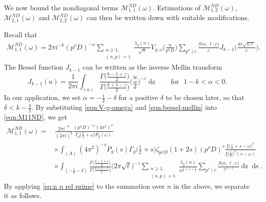 \documentclass[12pt]{amsart}
\theoremstyle{plain}
\theoremstyle{definition}
\begin{document}
We now bound the nondiagonal terms $ \mathcal{M}_{1,1}^{ND}(\omega)$. Estimations of $ \mathcal{M}_{1,2}^{ND}(\omega)$, $ \mathcal{M}_{2,1}^{ND}(\omega)$ and $ \mathcal{M}_{2,2}^{ND}(\omega)$ can then be written down with suitable modifications.
   
 Recall that 
  \begin{align}\label{eqn:M11ND}
     \mathcal{M}_{1,1}^{ND}(\omega)
    = 2\pi i^{-k} (p^\nu D)^{-\omega}  
     \sum_{\substack{n\geq 1, \\ (n, p)=1}}
    \frac{\lambda_g(n)}{\sqrt n} 
    V_{g, \omega}\Big(\frac{n}{p^\nu D}\Big)
    \sum_{p^\nu \mid c} 
    \frac{S\big(n, \ell; c\big)}{c}
    J_{k-1}\Big(\frac{4\pi\sqrt{n\ell}}{c}\Big).
 \end{align}
The Bessel function $J_{k-1}$ can be written as the inverse Mellin transform     
\begin{equation}\label{eqn:bessel-mellin}
    J_{k-1}(u) = \frac{1}{2\pi i} \int_{(\alpha)} \frac{\Gamma\big(\frac{k-1+z}{2}\big)}{\Gamma\big(\frac{k+1-z}{2}\big)}
    \Big(\frac{u}{2}\Big)^{-z} \mathop{dz}  \qquad \text{for } \,\, 1-k < \alpha <0. 
\end{equation}
In our application, we set $\alpha= -\frac12-\delta$ for a positive $\delta$ to be chosen later, so that $\delta <k-\frac32 $. By substituting \eqref{eqn:V-g-omega} and \eqref{eqn:bessel-mellin} into \eqref{eqn:M11ND}, we get
    \begin{equation}\label{eq:N ND 11}
    \begin{split}
     \mathcal{M}_{1,1}^{ND}(\omega)
    = &\, \frac{2\pi i^{-k}}{(2\pi i)^2}\frac{ (p^\nu D)^{-\omega} (4\pi^2)^{\omega} }{\Gamma_g\big(\frac12+\omega\big)P_g(\omega)} 
        \\&  \times \int_{(A)}(4\pi^2)^{-s}P_g(s) \Gamma_g\Big(\frac12+s\Big)  \zeta_{p^\nu D} (1+2s)  (p^\nu D)^{s} 
    \frac{\xi\big(\frac12+s-\omega\big)^5}{\xi\big(\frac12\big)^5(s-\omega)}     
  \\&  \times
    \int_{(-\frac12-\delta)}   \frac{\Gamma\big(\frac{k-1+z}{2}\big)}{\Gamma\big(\frac{k+1-z}{2}\big)}
    \big(2\pi\sqrt{\ell}\big)^{-z}  \sum_{\substack{n\geq 1, \\ (n, p)=1}}
    \frac{\lambda_g(n)}{n^{\frac12+s+\frac{z}{2}}} \sum_{p^\nu \mid c} 
    \frac{S\big(n, \ell; c\big)}{c^{1-z}}
\mathop{dz} \mathop{ds} .
    \end{split}
    \end{equation}     
By applying \eqref{eq:n p rel prime} to  the summation over $n$ in the above, we separate it as follows.
\end{document}
